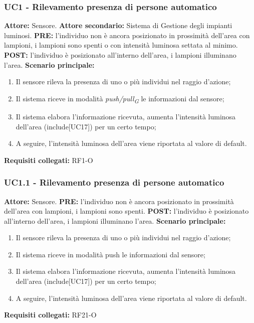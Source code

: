 \documentclass[a4paper, 12pt]{article}
\begin{document}
\subsubsection{UC1 - Rilevamento presenza di persone automatico}
\textbf{Attore:} Sensore.\newline
\textbf{Attore secondario:} Sistema di Gestione degli impianti luminosi.\newline
\textbf{PRE:} l'individuo non è ancora posizionato in prossimità dell'area con lampioni, i lampioni sono spenti o con intensità luminosa settata al minimo.\newline
\textbf{POST:} l'individuo è posizionato all'interno dell'area, i lampioni illuminano l'area.\newline
\textbf{Scenario principale:}
\begin{enumerate}
    \item Il sensore rileva la presenza di uno o più individui nel raggio d'azione;
    \item Il sistema riceve in modalità \textit{push/pull\textsubscript{G}} le informazioni dal sensore;
    \item Il sistema elabora l'informazione ricevuta, aumenta l'intensità luminosa dell'area (include[UC17]) per un certo tempo;
    \item A seguire, l'intensità luminosa dell'area viene riportata al valore di default.
\end{enumerate}
\textbf{Requisiti collegati:} RF1-O\newline 

\subsubsection{UC1.1 - Rilevamento presenza di persone automatico}
\textbf{Attore:} Sensore.\newline
\textbf{PRE:} l'individuo non è ancora posizionato in prossimità dell'area con lampioni, i lampioni sono spenti.\newline
\textbf{POST:} l'individuo è posizionato all'interno dell'area, i lampioni illuminano l'area.\newline
\textbf{Scenario principale:}
\begin{enumerate}
    \item Il sensore rileva la presenza di uno o più individui nel raggio d'azione;
    \item Il sistema riceve in modalità push le informazioni dal sensore;
    \item Il sistema elabora l'informazione ricevuta, aumenta l'intensità luminosa dell'area (include[UC17]) per un certo tempo;
    \item A seguire, l'intensità luminosa dell'area viene riportata al valore di default.
\end{enumerate}
\textbf{Requisiti collegati:} RF21-O\newline
\end{document}
